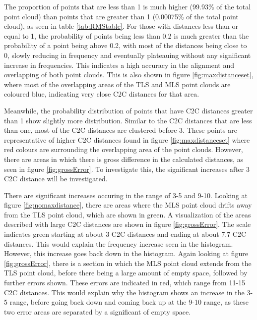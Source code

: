 \documentclass[man]{apa7}
\begin{document}
The proportion of points that are less than 1 is much higher (99.93\% of the total point cloud) than points that are greater than 1 (0.00075\% of the total point cloud), as seen in table \ref{tab:RMStable}. For those with distances less than or equal to 1, the probability of points being less than 0.2 is much greater than the probability of a point being above 0.2, with most of the distances being close to 0, slowly reducing in frequency and eventually plateauing without any significant increase in frequencies. This indicates a high accuracy in the alignment and overlapping of both point clouds. This is also shown in figure \ref{fig:maxdistanceset}, where most of the overlapping areas of the TLS and MLS point clouds are coloured blue, indicating very close C2C distances for that area. 

Meanwhile, the probability distribution of points that have C2C distances greater than 1 show slightly more distribution. Similar to the C2C distances that are less than one, most of the C2C distances are clustered before 3. These points are representative of higher C2C distances found in figure \ref{fig:maxdistanceset} where red colours are surrounding the overlapping area of the point clouds. However, there are areas in which there is gross difference in the calculated distances, as seen in figure \ref{fig:grossError}. To investigate this, the significant increases after 3 C2C distance will be investigated.

There are significant increases occuring in the range of 3-5 and 9-10. Looking at figure \ref{fig:nomaxdistance}, there are areas where the MLS point cloud drifts away from the TLS point cloud, which are shown in green. A visualization of the areas described with large C2C distances are shown in figure \ref{fig:grossError}. The scale indicates green starting at about 3 C2C distances and ending at about 7.7 C2C distances. This would explain the frequency increase seen in the histogram. However, this increase goes back down in the histogram. Again looking at figure \ref{fig:grossError}, there is a section in which the MLS point cloud extends from the TLS point cloud, before there being a large amount of empty space, followed by further errors shown. These errors are indicated in red, which range from 11-15 C2C distances. This would explain why the histogram shows an increase in the 3-5 range, before going back down and coming back up at the 9-10 range, as these two error areas are separated by a significant of empty space. 
\end{document}
